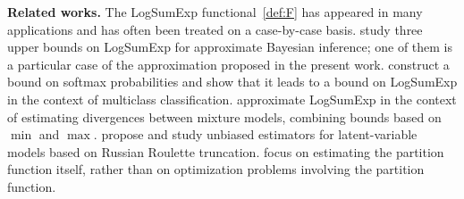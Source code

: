 \documentclass{article}
\theoremstyle{plain}
\theoremstyle{definition}
\theoremstyle{remark}
\begin{document}
\textbf{Related works.} 
The LogSumExp functional~\eqref{def:F} has appeared in many applications and has often been treated on a case-by-case basis. 
\citet{bouchard2007efficient} study three upper bounds on LogSumExp for approximate Bayesian inference; one of them is a particular case of the approximation proposed in the present work.
\citet{aueb2016one} construct a bound on softmax probabilities and show that it leads to a bound on LogSumExp in the context of multiclass classification.
\citet{nielsen2016guaranteed} approximate LogSumExp in the context of estimating divergences between mixture models, combining bounds based on $\min$ and $\max$.
\citet{Tucker2017REBAR,Luo2020SUMO} propose and study unbiased estimators for latent-variable models based on Russian Roulette truncation.
\citet{LyneGirolamiEtAl2015RussianRoulette,SpringShrivastava2017LSHPartition} focus on estimating the partition function itself, rather than on optimization problems involving the partition function.
\end{document}
